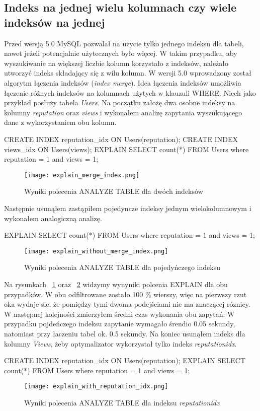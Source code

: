 \subsection{Indeks na jednej wielu kolumnach czy wiele indeksów na jednej}
Przed wersją 5.0 MySQL pozwalał na użycie tylko jednego indeksu dla tabeli, nawet jeżeli potencjalnie użytecznych było więcej. W takim przypadku, aby wyszukiwanie na większej liczbie kolumn korzystało z indeksów, należało utworzyć indeks składający się z wilu kolumn. W wersji 5.0 wprowadzony został algorytm łączenia indeksów (\textit{index merge}). Idea łączenia indeksów umożliwia łączenie różnych indeksów na kolumnach użytych w klauzuli WHERE. Niech jako przykład posłuży tabela \textit{Users}. Na początku założę dwa osobne indeksy na kolumny \textit{reputation} oraz \textit{views} i wykonałem analizę zapytania wyszukującego dane z wykorzystaniem obu kolumn.
\begin{spverbatim}
	CREATE INDEX reputation_idx ON Users(reputation);
	CREATE INDEX views_idx ON Users(views);
	EXPLAIN SELECT count(*) FROM Users where reputation = 1 and views = 1;
\end{spverbatim}
\begin{figure}
	\caption{Wyniki polecenia ANALYZE TABLE dla dwóch indeksów}
	\centering
	\texttt{[image: explain\_merge\_index.png]}
	\label{fig:explain_merge_index}
\end{figure}

Następnie usunąłem zastąpiłem pojedyncze indeksy jednym wielokolumnowym i wykonałem analogiczną analizę.
\begin{spverbatim}
	EXPLAIN SELECT count(*) FROM Users where reputation = 1 and views = 1;
\end{spverbatim}

\begin{figure}
	\caption{Wyniki polecenia ANALYZE TABLE dla pojedyńczego indeksu}
	\centering
	\texttt{[image: explain\_without\_merge\_index.png]}
	\label{fig:explain_without_merge_index}
\end{figure}

Na rysunkach ~\ref{fig:explain_merge_index} oraz ~\ref{fig:explain_without_merge_index} widzymy wynyniki polcenia EXPLAIN dla obu przypadków. W obu odfiltrowane zostało 100 \% wierszy, więc na pierwszy rzut oka wydaje sie, że pomiędzy tymi dwoma podejściami nie ma znaczącej róznicy. W następnej kolejności zmierzyłem średni czas wykonania obu zapytań. W przypadku pojdeńczego indeksu zapytanie wymagało śrendio 0.05 sekundy, natomiast przy łaczeniu tabel ok. 0.5 sekundy. Na koniec usunąłem indeks dla kolumny \textit{Views}, żeby optymalizator wykorzystał tylko indeks \textit{reputation\textunderscore idx}.
\begin{spverbatim}
	CREATE INDEX reputation_idx ON Users(reputation);
	EXPLAIN SELECT count(*) FROM Users where reputation = 1 and views = 1;
\end{spverbatim}
\begin{figure}
	\caption{Wyniki polecenia ANALYZE TABLE dla indeksu \textit{reputation\textunderscore idx}}
	\centering
	\texttt{[image: explain\_with\_reputation\_idx.png]}
	\label{fig:explain_with_reputation_idx}
\end{figure}

